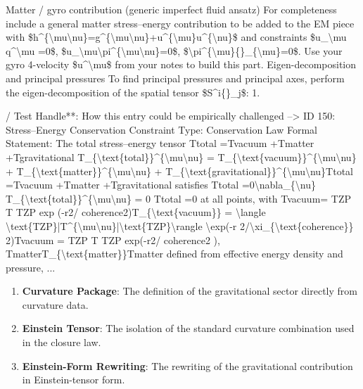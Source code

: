 Matter / gyro contribution (generic imperfect fluid ansatz) For completeness include a general matter stress--energy contribution to be added to the EM piece with \$h\textasciicircum{}\{\textbackslash{}mu\textbackslash{}nu\}=g\textasciicircum{}\{\textbackslash{}mu\textbackslash{}nu\}+u\textasciicircum{}\{\textbackslash{}mu\}u\textasciicircum{}\{\textbackslash{}nu\}\$ and constraints \$u\_\textbackslash{}mu q\textasciicircum{}\textbackslash{}mu =0\$, \$u\_\textbackslash{}mu\textbackslash{}pi\textasciicircum{}\{\textbackslash{}mu\textbackslash{}nu\}=0\$, \$\textbackslash{}pi\textasciicircum{}\{\textbackslash{}mu\}\{\}\_\{\textbackslash{}mu\}=0\$. Use your gyro 4-velocity \$u\textasciicircum{}\textbackslash{}mu\$ from your notes to build this part. Eigen-decomposition and principal pressures To find principal pressures and principal axes, perform the eigen-decomposition of the spatial tensor \$S\textasciicircum{}i\{\}\_j\$: 1.

/ Test Handle**: How this entry could be empirically challenged --> ID 150: Stress--Energy Conservation Constraint Type: Conservation Law Formal Statement: The total stress--energy tensor Ttotal  =Tvacuum  +Tmatter  +Tgravitational  T\_\{\textbackslash{}text\{total\}\}\textasciicircum{}\{\textbackslash{}mu\textbackslash{}nu\} = T\_\{\textbackslash{}text\{vacuum\}\}\textasciicircum{}\{\textbackslash{}mu\textbackslash{}nu\} + T\_\{\textbackslash{}text\{matter\}\}\textasciicircum{}\{\textbackslash{}mu\textbackslash{}nu\} + T\_\{\textbackslash{}text\{gravitational\}\}\textasciicircum{}\{\textbackslash{}mu\textbackslash{}nu\}Ttotal   =Tvacuum   +Tmatter   +Tgravitational   satisfies   Ttotal  =0\textbackslash{}nabla\_\{\textbackslash{}nu\} T\_\{\textbackslash{}text\{total\}\}\textasciicircum{}\{\textbackslash{}mu\textbackslash{}nu\} = 0   Ttotal   =0 at all points, with Tvacuum= TZP T   TZP exp (-r2/ coherence2)T\_\{\textbackslash{}text\{vacuum\}\} = \textbackslash{}langle \textbackslash{}text\{TZP\}|T\textasciicircum{}\{\textbackslash{}mu\textbackslash{}nu\}|\textbackslash{}text\{TZP\}\textbackslash{}rangle \textbackslash{}exp(-r 2/\textbackslash{}xi\_\{\textbackslash{}text\{coherence\}\} 2)Tvacuum = TZP T   TZP exp(-r2/ coherence2 ), TmatterT\_\{\textbackslash{}text\{matter\}\}Tmatter defined from effective energy density and pressure, ...
\endgroup

\begin{enumerate}[leftmargin=1.6em,itemsep=6pt,topsep=4pt]
\item \textbf{Curvature Package}: The definition of the gravitational sector directly from curvature data.
\item \textbf{Einstein Tensor}: The isolation of the standard curvature combination used in the closure law.
\item \textbf{Einstein-Form Rewriting}: The rewriting of the gravitational contribution in Einstein-tensor form.
\end{enumerate}

